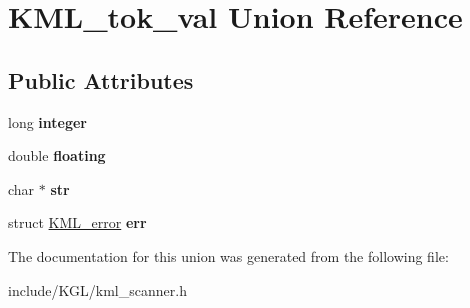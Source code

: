 \hypertarget{union_k_m_l__tok__val}{}\section{K\+M\+L\+\_\+tok\+\_\+val Union Reference}
\label{union_k_m_l__tok__val}
\subsection*{Public Attributes}
\begin{DoxyCompactItemize}
\item 
\mbox{\label{union_k_m_l__tok__val_ab224e2f85ef61818d6b5a5a7d213dc66}} 
long {\bfseries integer}
\item 
\mbox{\label{union_k_m_l__tok__val_accdb3eccf0a7e4c28f8fd1f5b3644dab}} 
double {\bfseries floating}
\item 
\mbox{\label{union_k_m_l__tok__val_ab88e69f40910b205af090ebac0515299}} 
char $\ast$ {\bfseries str}
\item 
\mbox{\label{union_k_m_l__tok__val_a82a6bcaba701c560846bbae6c287de94}} 
struct \mbox{\hyperlink{struct_k_m_l__error}{K\+M\+L\+\_\+error}} {\bfseries err}
\end{DoxyCompactItemize}


The documentation for this union was generated from the following file\+:\begin{DoxyCompactItemize}
\item 
include/\+K\+G\+L/kml\+\_\+scanner.\+h\end{DoxyCompactItemize}
